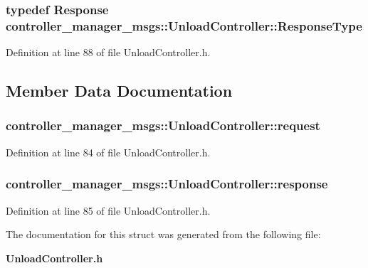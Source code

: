 \subsubsection[{\-Response\-Type}]{\setlength{\rightskip}{0pt plus 5cm}typedef {\bf \-Response} {\bf controller\-\_\-manager\-\_\-msgs\-::\-Unload\-Controller\-::\-Response\-Type}}\label{structcontroller__manager__msgs_1_1UnloadController_a4b75c17536616f1be665826718516d2d}


\-Definition at line 88 of file \-Unload\-Controller.\-h.



\subsection{\-Member \-Data \-Documentation}
\subsubsection[{request}]{ {\bf controller\-\_\-manager\-\_\-msgs\-::\-Unload\-Controller\-::request}}\label{structcontroller__manager__msgs_1_1UnloadController_aeed792c5bb119ca6bf3a22989cc24d94}


\-Definition at line 84 of file \-Unload\-Controller.\-h.

\subsubsection[{response}]{ {\bf controller\-\_\-manager\-\_\-msgs\-::\-Unload\-Controller\-::response}}\label{structcontroller__manager__msgs_1_1UnloadController_af4e6cb084fd4c5ea6a97c621b8ad5aea}


\-Definition at line 85 of file \-Unload\-Controller.\-h.



\-The documentation for this struct was generated from the following file\-:\begin{DoxyCompactItemize}
\item 
{\bf \-Unload\-Controller.\-h}\end{DoxyCompactItemize}
